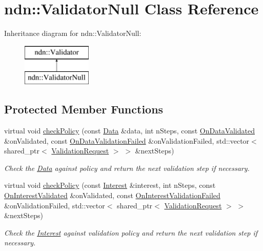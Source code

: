 \hypertarget{classndn_1_1ValidatorNull}{}\section{ndn\+:\+:Validator\+Null Class Reference}
\label{classndn_1_1ValidatorNull}
Inheritance diagram for ndn\+:\+:Validator\+Null\+:\begin{figure}[H]
\begin{center}
\leavevmode
\includegraphics[height=2.000000cm]{classndn_1_1ValidatorNull}
\end{center}
\end{figure}
\subsection*{Protected Member Functions}
\begin{DoxyCompactItemize}
\item 
virtual void \hyperlink{classndn_1_1ValidatorNull_a6e29ebc70c7655b3f2c14c20c41e0659}{check\+Policy} (const \hyperlink{classndn_1_1Data}{Data} \&data, int n\+Steps, const \hyperlink{namespacendn_aeaa15e849fd25636f59ca61acb64e532}{On\+Data\+Validated} \&on\+Validated, const \hyperlink{namespacendn_ae3c60219d74ba747e368708d93782760}{On\+Data\+Validation\+Failed} \&on\+Validation\+Failed, std\+::vector$<$ shared\+\_\+ptr$<$ \hyperlink{classndn_1_1ValidationRequest}{Validation\+Request} $>$ $>$ \&next\+Steps)
\begin{DoxyCompactList}\small\item\em Check the \hyperlink{classndn_1_1Data}{Data} against policy and return the next validation step if necessary. \end{DoxyCompactList}\item 
virtual void \hyperlink{classndn_1_1ValidatorNull_a90aa622f4ee7115ac2cf6ed6fa3e7af7}{check\+Policy} (const \hyperlink{classndn_1_1Interest}{Interest} \&interest, int n\+Steps, const \hyperlink{namespacendn_a90fe4b4d97a7870d87f2fce8fdc88f95}{On\+Interest\+Validated} \&on\+Validated, const \hyperlink{namespacendn_a6cb4f04de7c1e8da06d8f5865b3d2877}{On\+Interest\+Validation\+Failed} \&on\+Validation\+Failed, std\+::vector$<$ shared\+\_\+ptr$<$ \hyperlink{classndn_1_1ValidationRequest}{Validation\+Request} $>$ $>$ \&next\+Steps)
\begin{DoxyCompactList}\small\item\em Check the \hyperlink{classndn_1_1Interest}{Interest} against validation policy and return the next validation step if necessary. \end{DoxyCompactList}\end{DoxyCompactItemize}
